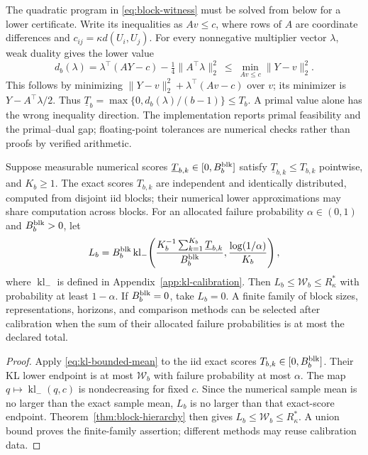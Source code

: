 The quadratic program in \eqref{eq:block-witness} must be solved from
below for a lower certificate. Write its inequalities as $Av\leq c$,
where rows of $A$ are coordinate differences and
$c_{ij}=\kappa d(U_i,U_j)$. For every nonnegative multiplier vector
$\lambda$, weak duality gives the lower value
\begin{equation}
 d_b(\lambda)=\lambda^\top(AY-c)
                       -\tfrac14\|A^\top\lambda\|_2^2
 \ \leq\ \min_{Av\leq c}\|Y-v\|_2^2.
 \label{eq:block-dual}
\end{equation}
This follows by minimizing
$\|Y-v\|_2^2+\lambda^\top(Av-c)$ over $v$; its minimizer is
$Y-A^\top\lambda/2$.
Thus
$\underline T_b=\max\{0,d_b(\lambda)/(b-1)\}\leq T_b$.
A primal value alone has the wrong inequality direction. The
implementation reports primal feasibility and the primal--dual gap;
floating-point tolerances are numerical checks rather than proofs by
verified arithmetic.

\begin{corollary}
\label{cor:block-calibration}
Suppose measurable numerical scores
$\underline T_{b,k}\in[0,B_b^{\rm blk}]$ satisfy
$\underline T_{b,k}\leq T_{b,k}$ pointwise, and $K_b\geq1$.
The exact scores $T_{b,k}$ are independent and identically distributed,
computed from disjoint iid blocks; their numerical lower approximations
may share computation across blocks.
For an allocated failure probability $\alpha\in(0,1)$ and $B_b^{\rm blk}>0$,
let
\begin{equation}
 L_b=B_b^{\rm blk}\operatorname{kl}_-\!\left(
       \frac{K_b^{-1}\sum_{k=1}^{K_b}\underline T_{b,k}}{B_b^{\rm blk}},
       \frac{\log(1/\alpha)}{K_b}\right),
 \label{eq:block-lower}
\end{equation}
where $\operatorname{kl}_-$ is defined in
Appendix~\ref{app:kl-calibration}. Then
$L_b\leq \mathcal{W}_b\leq R^*_\kappa$ with probability at least
$1-\alpha$. If $B_b^{\rm blk}=0$, take $L_b=0$. A finite family of block
sizes, representations, horizons, and comparison methods can be
selected after calibration when the sum of their allocated failure
probabilities is at most the declared total.
\end{corollary}

\begin{proof}
Apply \eqref{eq:kl-bounded-mean} to the iid exact scores
$T_{b,k}\in[0,B_b^{\rm blk}]$. Their KL lower endpoint is at most
$\mathcal W_b$ with failure probability at most $\alpha$. The map
$q\mapsto\operatorname{kl}_-(q,c)$ is nondecreasing for fixed $c$.
Since the numerical sample mean is no larger than the exact sample mean,
$L_b$ is no larger than that exact-score endpoint. Theorem~\ref{thm:block-hierarchy}
then gives $L_b\leq\mathcal W_b\leq R^*_\kappa$. A union bound proves
the finite-family assertion; different methods may reuse calibration data.
\end{proof}

